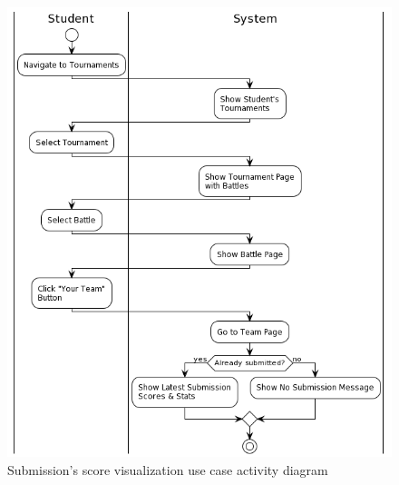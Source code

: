 \begin{center}
\begin{tabular}{ |c|m{10cm}| }
        \hline
    \end{tabular}
    \begin{figure}[H]
        \hspace{37px}
        \includegraphics[scale=0.5]{Diagrams/activity_visualizesubmissionscore.png}
        \caption{Submission's score visualization use case activity diagram}
    \end{figure}
\end{center}
\newpage

